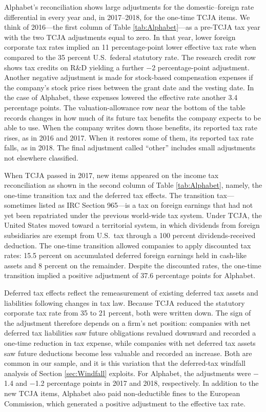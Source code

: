 \documentclass[11pt,letterpaper]{article}
\begin{document}
Alphabet's reconciliation shows large adjustments for the domestic--foreign
rate differential in every year and, in 2017--2018, for the one-time TCJA
items. We think of 2016---the first column of Table \ref{tab:Alphabet}---as 
a pre-TCJA tax year with the
two TCJA adjustments equal to zero. In that year, lower foreign
corporate tax rates implied an 11 percentage-point lower effective
tax rate when compared to the 35 percent
U.S.~federal statutory rate. The research credit row shows tax credits on R\&D
yielding a further $-$2 percentage-point adjustment. Another negative adjustment
is made for stock-based compensation expenses if the company's stock
price rises between the grant date and the vesting date. 
In the case of Alphabet, these expenses lowered the effective rate another
3.4 percentage points. 
The valuation-allowance row near the bottom of the table records 
changes in how much of its future tax
benefits the company expects to be able to use. When the company writes down
those benefits, its reported tax rate rises, as in 2016 and 2017. When it
restores some of them, its reported tax rate falls, as in 2018.
The final adjustment called ``other''
includes small adjustments not elsewhere classified.

When TCJA passed in 2017, new items appeared on the income
tax reconciliation as shown in the second column of Table \ref{tab:Alphabet},
namely, the one-time transition tax and the deferred tax
effects.  The transition tax---sometimes listed as IRC Section 965---is a tax 
on foreign earnings that had not yet been repatriated under the previous world-wide
tax system. Under TCJA, the United States moved toward a territorial system, in which
dividends from foreign subsidiaries are exempt from U.S.\ tax through a
100 percent dividends-received deduction. The one-time transition allowed companies to apply discounted tax rates:
15.5 percent on accumulated deferred foreign earnings held in cash-like assets and
8 percent on the remainder.  Despite the discounted rates,
the one-time transition implied a positive adjustment of 37.6 percentage
points for Alphabet.

Deferred tax effects reflect the remeasurement of existing deferred 
tax assets and liabilities following changes in tax law. Because 
TCJA reduced the statutory corporate tax rate from 35 to 21 percent, 
both were written down. The sign of the adjustment therefore depends
on a firm's net position: companies with net deferred tax liabilities
saw future obligations revalued downward and recorded a one-time
reduction in tax expense, while companies with net deferred tax
assets saw future deductions become less valuable and recorded an
increase. Both are common in our sample, and it is this variation
that the deferred-tax windfall analysis of Section \ref{sec:Windfall}
exploits. For Alphabet, the adjustments were $-$1.4 and $-$1.2
percentage points in 2017 and 2018, respectively.
In addition to the new TCJA items, Alphabet also paid non-deductible fines
to the European Commission, which generated a positive adjustment 
to the effective tax rate.
\end{document}

